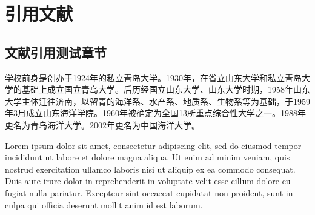 \chapter{引用文献}
\section{文献引用测试章节}
学校前身是创办于1924年的私立青岛大学\cite{lamport94}。1930年，在省立山东大学和私立青岛大学的基础上成立国立青岛大学。后历经国立山东大学、山东大学时期\cite{dwx}，1958年山东大学主体迁往济南，以留青的海洋系、水产系、地质系、生物系等为基础，于1959年3月成立山东海洋学院。1960年被确定为全国13所重点综合性大学之一。1988年更名为青岛海洋大学。2002年更名为中国海洋大学。

Lorem ipsum dolor sit amet\cite{xd}, consectetur adipiscing elit, sed do eiusmod tempor
incididunt ut labore et dolore magna aliqua.
Ut enim ad minim veniam, quis nostrud exercitation ullamco laboris nisi ut
aliquip ex ea commodo consequat.
Duis aute irure dolor in reprehenderit in voluptate velit esse cillum dolore eu
fugiat nulla pariatur.
Excepteur sint occaecat cupidatat non proident, sunt in culpa qui officia
deserunt mollit anim id est laborum.

